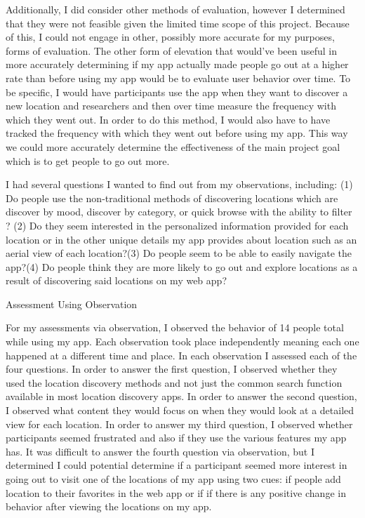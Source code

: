 \documentclass[12pt,twocolumn]{article}
\begin{document}
Additionally, I did consider other methods of evaluation, however I determined that they were not feasible given the limited time scope of this project. Because of this, I could not engage in other, possibly more accurate for my purposes, forms of evaluation. The other form of elevation that would've been useful in more accurately determining if my app actually made people go out at a higher rate than before using my app  would be to evaluate user behavior over time. To be specific, I would have participants use the app when they want to discover a new location and researchers and then over time measure the frequency with which they went out. In order to do this method, I would also have to have tracked the frequency with which they went out before using my app. This way we could more accurately determine the  effectiveness of the main project goal which is to get people to go out more. 

I had several questions I wanted to find out from my observations, including: (1) Do people use the non-traditional methods of discovering locations which are discover by mood, discover by category, or quick browse with the ability to filter ? (2) Do they seem interested in the personalized information provided for each location or in the other unique details my app provides about location such as an aerial view of each location?(3) Do people seem to be able to easily navigate the app?(4) Do people think they are more likely to go out and explore locations as a result of discovering said locations on my web app?

Assessment Using Observation

For my assessments via observation, I observed the behavior of 14 people total while using my app. Each observation took place independently meaning each one happened at a different time and place. In each observation I assessed each of the four questions. In order to answer the first question, I observed whether they used the location discovery methods and not just the common search function available in most location discovery apps. In order to answer the second question, I observed what content they would focus on when they would look at a detailed view for each location. In order to answer my third question, I observed whether participants seemed frustrated and also if they use the various features my app has.   It was difficult to answer the fourth question via observation, but I determined I could potential  determine if a participant seemed more interest in going out to visit one of the locations of my app using two cues: if people add location to their favorites in the web app or if if there is any positive change in behavior after viewing the locations on my app.
\end{document}
